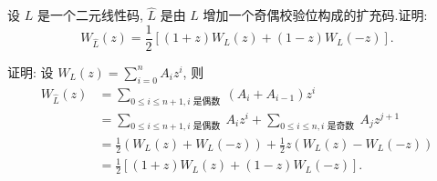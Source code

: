 \begin{exercise}
    设 $ L $ 是一个二元线性码, $ \widehat{L} $ 是由 $ L $ 增加一个奇偶校验位构成的扩充码.证明:
$$
W_{\hat{L}}(z)=\frac{1}{2}\left[(1+z) W_{L}(z)+(1-z) W_{L}(-z)\right] .
$$
\end{exercise}
\begin{solution}
证明: 设 $ W_{L}(z)=\sum\limits_{i=0}^{n} A_{i} z^{i} $, 则
$$
\begin{aligned}
W_{\widehat{L}}(z)&=\sum_{0 \leq i \leq n+1, i \text { 是偶数 }}\left(A_{i}+A_{i-1}\right) z^{i} \\
&=\sum_{0 \leq i \leq n+1, i \text { 是偶数 }} A_{i} z^{i}+\sum_{0 \leq i \leq n, i \text { 是奇数 }} A_{j} z^{j+1} \\
&=\frac{1}{2}\left(W_{L}(z)+W_{L}(-z)\right)+\frac{1}{2} z\left(W_{L}(z)-W_{L}(-z)\right) \\
&=\frac{1}{2}\left[(1+z) W_{L}(z)+(1-z) W_{L}(-z)\right] .
\end{aligned}
$$
\end{solution}